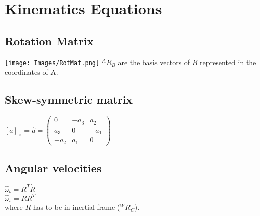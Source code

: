 \section{Kinematics Equations}
\subsection*{Rotation Matrix}
\texttt{[image: Images/RotMat.png]}
$^A R_B$ are the basis vectors of $B$ represented in the coordinates of
A.
\subsection*{Skew-symmetric matrix}
$[a]_\times = \hat{a} = \begin{pmatrix}
  0 & -a_3 & a_2 \\ 
  a_3 & 0 & -a_1 \\
  -a_2 & a_1 & 0
\end{pmatrix}$

\subsection*{Angular velocities}
$\hat\omega_b = R^T \dot{R}$ \\
$\hat\omega_s = \dot{R}R^T$ \\
where $R$ has to be in inertial frame ($^W R_C$).
